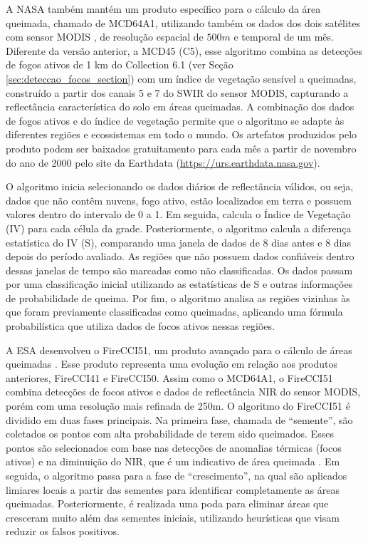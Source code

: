 \documentclass[cic,tc]{iiufrgs}
\begin{document}
A NASA também mantém um produto específico para o cálculo da área queimada, chamado de MCD64A1, utilizando também os dados dos dois satélites com sensor MODIS \citep{GIGLIO201872}, de resolução espacial de $500m$ e temporal de um mês. Diferente da versão anterior, a MCD45 (C5), esse algoritmo combina as detecções de fogos ativos de 1 km do Collection 6.1 (ver Seção \ref{sec:deteccao_focos_section}) com um índice de vegetação sensível a queimadas, construído a partir dos canais 5 e 7 do SWIR do sensor MODIS, capturando a reflectância característica do solo em áreas queimadas. A combinação dos dados de fogos ativos e do índice de vegetação permite que o algoritmo se adapte às diferentes regiões e ecossistemas em todo o mundo. Os artefatos produzidos pelo produto podem ser baixados gratuitamento para cada mês a partir de novembro do ano de 2000 pelo site da Earthdata (\url{https://urs.earthdata.nasa.gov}).

O algoritmo inicia selecionando os dados diários de reflectância válidos, ou seja, dados que não contêm nuvens, fogo ativo, estão localizados em terra e possuem valores dentro do intervalo de 0 a 1. Em seguida, calcula o Índice de Vegetação (IV) para cada célula da grade. Posteriormente, o algoritmo calcula a diferença estatística do IV (S), comparando uma janela de dados de 8 dias antes e 8 dias depois do período avaliado. As regiões que não possuem dados confiáveis dentro dessas janelas de tempo são marcadas como não classificadas. Os dados passam por uma classificação inicial utilizando as estatísticas de S e outras informações de probabilidade de queima. Por fim, o algoritmo analisa as regiões vizinhas às que foram previamente classificadas como queimadas, aplicando uma fórmula probabilística que utiliza dados de focos ativos nessas regiões.

A ESA desenvolveu o FireCCI51, um produto avançado para o cálculo de áreas queimadas \citep{Lizundia2020}. Esse produto representa uma evolução em relação aos produtos anteriores, FireCCI41 e FireCCI50. Assim como o MCD64A1, o FireCCI51 combina detecções de focos ativos e dados de reflectância NIR do sensor MODIS, porém com uma resolução mais refinada de 250m. O algoritmo do FireCCI51 é dividido em duas fases principais. Na primeira fase, chamada de ``semente'', são coletados os pontos com alta probabilidade de terem sido queimados. Esses pontos são selecionados com base nas detecções de anomalias térmicas (focos ativos) e na diminuição do NIR, que é um indicativo de área queimada \citep{pereira1999}. Em seguida, o algoritmo passa para a fase de ``crescimento'', na qual são aplicados limiares locais a partir das sementes para identificar completamente as áreas queimadas. Posteriormente, é realizada uma poda para eliminar áreas que cresceram muito além das sementes iniciais, utilizando heurísticas que visam reduzir os falsos positivos.
\end{document}
